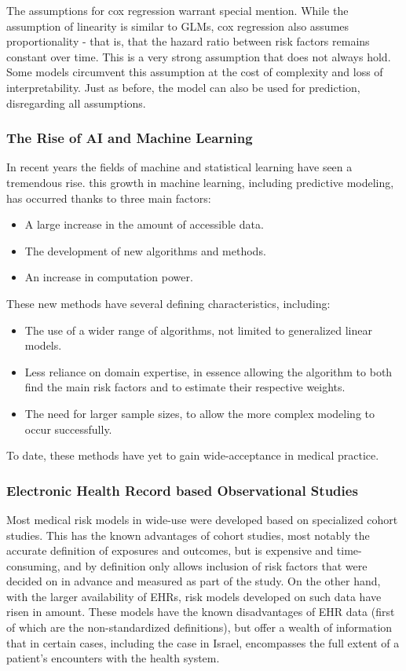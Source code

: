 \documentclass[a4paper,12pt]{article}
\begin{document}
			The assumptions for cox regression warrant special mention. While the assumption of linearity is similar to GLMs, cox regression also assumes proportionality - that is, that the hazard ratio between risk factors remains constant over time. This is a very strong assumption that does not always hold. Some models circumvent this assumption at the cost of complexity and loss of interpretability. Just as before, the model can also be used for prediction, disregarding all assumptions.
			
			\subsubsection{The Rise of AI and Machine Learning}
		
			In recent years the fields of machine and statistical learning have seen a tremendous rise\cite{Obermeyer2016}. this growth in machine learning, including predictive modeling, has occurred thanks to three main factors\cite{Shalev-Shwartz2014}:
			\begin{itemize}
				\item A large increase in the amount of accessible data.
				\item The development of new algorithms and methods.
				\item An increase in computation power.
			\end{itemize} 
			These new methods have several defining characteristics, including:
			\begin{itemize}
				\item The use of a wider range of algorithms, not limited to generalized linear models.
				\item Less reliance on domain expertise, in essence allowing the algorithm to both find the main risk factors and to estimate their respective weights.
				\item The need for larger sample sizes, to allow the more complex modeling to occur successfully.
			\end{itemize}
			To date, these methods have yet to gain wide-acceptance in medical practice\cite{Obermeyer2016,Deo2015}.
			
			\subsubsection{Electronic Health Record based Observational Studies}
		
			Most medical risk models in wide-use were developed based on specialized cohort studies\cite{Goldstein2016}. This has the known advantages of cohort studies, most notably the accurate definition of exposures and outcomes, but is expensive and time-consuming, and by definition only allows inclusion of risk factors that were decided on in advance and measured as part of the study. On the other hand, with the larger availability of EHRs, risk models developed on such data have risen in amount. These models have the known disadvantages of EHR data (first of which are the non-standardized definitions), but offer a wealth of information that in certain cases, including the case in Israel\cite{Lovis2015}, encompasses the full extent of a patient's encounters with the health system\cite{Goldstein2017}.
			
\end{document}
